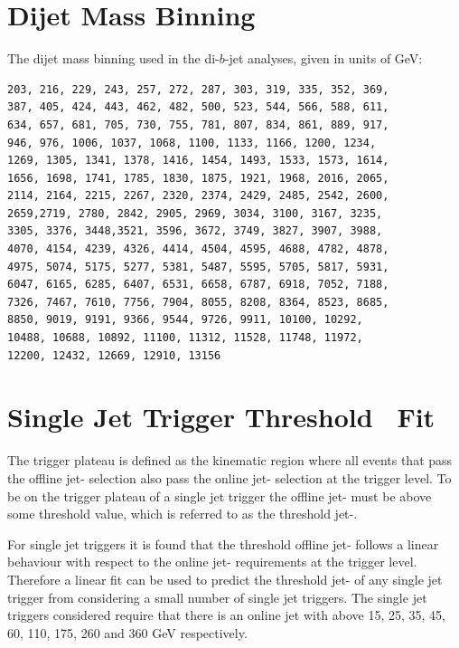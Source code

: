 
\appendix

\clearpage
{}
{}

\chapter{Dijet Mass Binning}
\label{app:dijet_bins}

\noindent
The dijet mass binning used in the di-$b$-jet analyses, given in units of GeV:
\begin{verbatim}
203, 216, 229, 243, 257, 272, 287, 303, 319, 335, 352, 369,
387, 405, 424, 443, 462, 482, 500, 523, 544, 566, 588, 611, 
634, 657, 681, 705, 730, 755, 781, 807, 834, 861, 889, 917,
946, 976, 1006, 1037, 1068, 1100, 1133, 1166, 1200, 1234,
1269, 1305, 1341, 1378, 1416, 1454, 1493, 1533, 1573, 1614,
1656, 1698, 1741, 1785, 1830, 1875, 1921, 1968, 2016, 2065, 
2114, 2164, 2215, 2267, 2320, 2374, 2429, 2485, 2542, 2600, 
2659,2719, 2780, 2842, 2905, 2969, 3034, 3100, 3167, 3235, 
3305, 3376, 3448,3521, 3596, 3672, 3749, 3827, 3907, 3988, 
4070, 4154, 4239, 4326, 4414, 4504, 4595, 4688, 4782, 4878, 
4975, 5074, 5175, 5277, 5381, 5487, 5595, 5705, 5817, 5931, 
6047, 6165, 6285, 6407, 6531, 6658, 6787, 6918, 7052, 7188, 
7326, 7467, 7610, 7756, 7904, 8055, 8208, 8364, 8523, 8685, 
8850, 9019, 9191, 9366, 9544, 9726, 9911, 10100, 10292, 
10488, 10688, 10892, 11100, 11312, 11528, 11748, 11972, 
12200, 12432, 12669, 12910, 13156
\end{verbatim}


\chapter{Single Jet Trigger Threshold~\pT{} Fit}
\label{app:triggerTurnOn_fit}

The trigger plateau is defined as the kinematic region where all events that pass the offline jet-\pT{} selection
also pass the online jet-\pT{} selection at the trigger level.
To be on the trigger plateau of a single jet trigger
the offline jet-\pT{} must be above some threshold value,
which is referred to as the threshold jet-\pT{}.

For single jet triggers it is found that the threshold offline jet-\pT{} follows
a linear behaviour with respect to the online jet-\pT{} requirements at the trigger level.
Therefore a linear fit can be used to predict the threshold jet-\pT{} of any single jet trigger
from considering a small number of single jet triggers.
The single jet triggers considered require that there is an online jet with \pT{} above
15, 25, 35, 45, 60, 110, 175, 260 and 360 GeV respectively.

